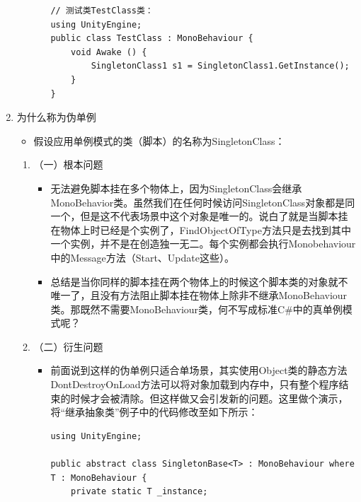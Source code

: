 \documentclass[9pt, b5paper]{article}
\begin{document}
\begin{enumerate}
\begin{enumerate}
\begin{itemize}
\begin{verbatim}
// 测试类TestClass类：
using UnityEngine;
public class TestClass : MonoBehaviour {
    void Awake () {
        SingletonClass1 s1 = SingletonClass1.GetInstance();
    }
}
\end{verbatim}
\end{itemize}
\end{enumerate}
\item 为什么称为伪单例
\label{sec:orga0a2ffb}
\begin{itemize}
\item 假设应用单例模式的类（脚本）的名称为SingletonClass：
\end{itemize}
\begin{enumerate}
\item （一）根本问题
\label{sec:org1789432}
\begin{itemize}
\item 无法避免脚本挂在多个物体上，因为SingletonClass会继承MonoBehavior类。虽然我们在任何时候访问SingletonClass对象都是同一个，但是这不代表场景中这个对象是唯一的。说白了就是当脚本挂在物体上时已经是个实例了，FindObjectOfType方法只是去找到其中一个实例，并不是在创造独一无二。每个实例都会执行Monobehaviour中的Message方法（Start、Update这些）。
\item 总结是当你同样的脚本挂在两个物体上的时候这个脚本类的对象就不唯一了，且没有方法阻止脚本挂在物体上除非不继承MonoBehaviour类。那既然不需要MonoBehaviour类，何不写成标准C\#中的真单例模式呢？
\end{itemize}
\item （二）衍生问题
\label{sec:org70390df}
\begin{itemize}
\item 前面说到这样的伪单例只适合单场景，其实使用Object类的静态方法DontDestroyOnLoad方法可以将对象加载到内存中，只有整个程序结束的时候才会被清除。但这样做又会引发新的问题。这里做个演示，将“继承抽象类”例子中的代码修改至如下所示：
\begin{verbatim}
using UnityEngine;

public abstract class SingletonBase<T> : MonoBehaviour where T : MonoBehaviour {
    private static T _instance;
    

\end{verbatim}
\end{itemize}
\end{enumerate}
\end{enumerate}
\end{document}

